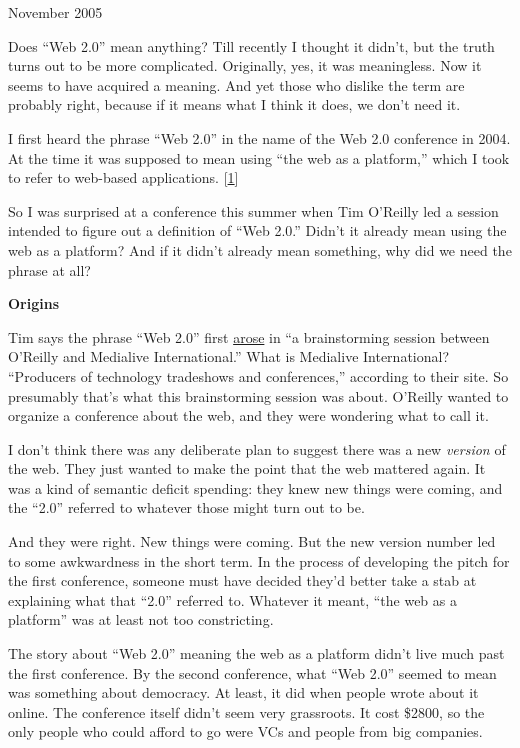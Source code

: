 November 2005

Does ``Web 2.0'' mean anything? Till recently I thought it didn't, but
the truth turns out to be more complicated. Originally, yes, it was
meaningless. Now it seems to have acquired a meaning. And yet those who
dislike the term are probably right, because if it means what I think it
does, we don't need it.

I first heard the phrase ``Web 2.0'' in the name of the Web 2.0
conference in 2004. At the time it was supposed to mean using ``the web
as a platform,'' which I took to refer to web-based applications.
{[}\hyperref[f1n]{1}{]}

So I was surprised at a conference this summer when Tim O'Reilly led a
session intended to figure out a definition of ``Web 2.0.'' Didn't it
already mean using the web as a platform? And if it didn't already mean
something, why did we need the phrase at all?

\textbf{Origins}

Tim says the phrase ``Web 2.0'' first
\href{http://www.oreillynet.com/pub/a/oreilly/tim/news/2005/09/30/what-is-web-20\%20.html}{arose}
in ``a brainstorming session between O'Reilly and Medialive
International.'' What is Medialive International? ``Producers of
technology tradeshows and conferences,'' according to their site. So
presumably that's what this brainstorming session was about. O'Reilly
wanted to organize a conference about the web, and they were wondering
what to call it.

I don't think there was any deliberate plan to suggest there was a new
\emph{version} of the web. They just wanted to make the point that the
web mattered again. It was a kind of semantic deficit spending: they
knew new things were coming, and the ``2.0'' referred to whatever those
might turn out to be.

And they were right. New things were coming. But the new version number
led to some awkwardness in the short term. In the process of developing
the pitch for the first conference, someone must have decided they'd
better take a stab at explaining what that ``2.0'' referred to. Whatever
it meant, ``the web as a platform'' was at least not too constricting.

The story about ``Web 2.0'' meaning the web as a platform didn't live
much past the first conference. By the second conference, what ``Web
2.0'' seemed to mean was something about democracy. At least, it did
when people wrote about it online. The conference itself didn't seem
very grassroots. It cost \$2800, so the only people who could afford to
go were VCs and people from big companies.

